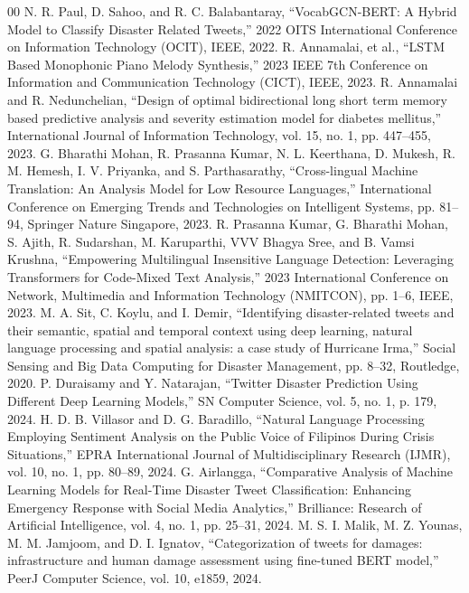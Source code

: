 \documentclass[conference]{IEEEtran}
\begin{document}
\begin{thebibliography}{00}
 N. R. Paul, D. Sahoo, and R. C. Balabantaray, ``VocabGCN-BERT: A Hybrid Model to Classify Disaster Related Tweets,'' 2022 OITS International Conference on Information Technology (OCIT), IEEE, 2022.
 R. Annamalai, et al., ``LSTM Based Monophonic Piano Melody Synthesis,'' 2023 IEEE 7th Conference on Information and Communication Technology (CICT), IEEE, 2023.
 R. Annamalai and R. Nedunchelian, ``Design of optimal bidirectional long short term memory based predictive analysis and severity estimation model for diabetes mellitus,'' International Journal of Information Technology, vol. 15, no. 1, pp. 447--455, 2023.
 G. Bharathi Mohan, R. Prasanna Kumar, N. L. Keerthana, D. Mukesh, R. M. Hemesh, I. V. Priyanka, and S. Parthasarathy, ``Cross-lingual Machine Translation: An Analysis Model for Low Resource Languages,'' International Conference on Emerging Trends and Technologies on Intelligent Systems, pp. 81--94, Springer Nature Singapore, 2023.
 R. Prasanna Kumar, G. Bharathi Mohan, S. Ajith, R. Sudarshan, M. Karuparthi, VVV Bhagya Sree, and B. Vamsi Krushna, ``Empowering Multilingual Insensitive Language Detection: Leveraging Transformers for Code-Mixed Text Analysis,'' 2023 International Conference on Network, Multimedia and Information Technology (NMITCON), pp. 1--6, IEEE, 2023.
 M. A. Sit, C. Koylu, and I. Demir, ``Identifying disaster-related tweets and their semantic, spatial and temporal context using deep learning, natural language processing and spatial analysis: a case study of Hurricane Irma,'' Social Sensing and Big Data Computing for Disaster Management, pp. 8--32, Routledge, 2020.
 P. Duraisamy and Y. Natarajan, ``Twitter Disaster Prediction Using Different Deep Learning Models,'' SN Computer Science, vol. 5, no. 1, p. 179, 2024.
 H. D. B. Villasor and D. G. Baradillo, ``Natural Language Processing Employing Sentiment Analysis on the Public Voice of Filipinos During Crisis Situations,'' EPRA International Journal of Multidisciplinary Research (IJMR), vol. 10, no. 1, pp. 80--89, 2024.
 G. Airlangga, ``Comparative Analysis of Machine Learning Models for Real-Time Disaster Tweet Classification: Enhancing Emergency Response with Social Media Analytics,'' Brilliance: Research of Artificial Intelligence, vol. 4, no. 1, pp. 25--31, 2024.
 M. S. I. Malik, M. Z. Younas, M. M. Jamjoom, and D. I. Ignatov, ``Categorization of tweets for damages: infrastructure and human damage assessment using fine-tuned BERT model,'' PeerJ Computer Science, vol. 10, e1859, 2024.

\end{thebibliography}
\end{document}
